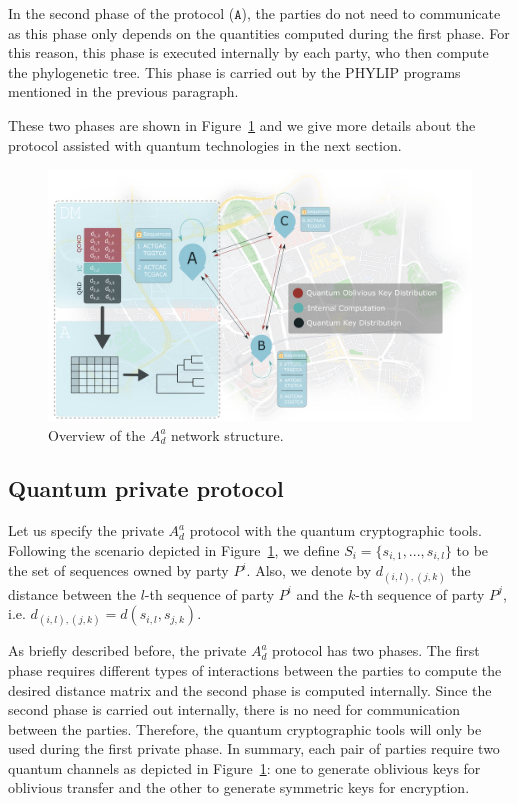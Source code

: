In the second phase of the protocol ($\mathtt{A}$), the parties do not need to communicate as this phase only depends on the quantities computed during the first phase. For this reason, this phase is executed internally by each party, who then compute the phylogenetic tree. This phase is carried out by the PHYLIP programs mentioned in the previous paragraph.

These two phases are shown in Figure~\ref{fig:network} and we give more details about the protocol assisted with quantum technologies in the next section. 

\begin{figure}[t]
    \centering
    \includegraphics[scale=0.8]{Chapter_PrivatePhylogeneticTrees/PPT.png}
    \caption{Overview of the $A^a_d$ network structure.}
    \label{fig:network}
\end{figure}

\subsection{Quantum private protocol}\label{privProtocol}

Let us specify the private $A_d^a$ protocol with the quantum cryptographic tools. Following the scenario depicted in Figure~\ref{fig:network}, we define $S_i = \{s_{i,1}, ..., s_{i,l}\}$ to be the set of sequences owned by party $P^i$. Also, we denote by $d_{(i,l), (j, k)}$ the distance between the $l$-th sequence of party $P^i$ and the $k$-th sequence of party $P^j$, i.e. $d_{(i,l), (j, k)} = d(s_{i,l}, s_{j,k})$.

As briefly described before, the private $A_d^a$ protocol has two phases. The first phase requires different types of interactions between the parties to compute the desired distance matrix and the second phase is computed internally. Since the second phase is carried out internally, there is no need for communication between the parties. Therefore, the quantum cryptographic tools will only be used during the first private phase. In summary, each pair of parties require two quantum channels as depicted in Figure~\ref{fig:network}: one to generate oblivious keys for oblivious transfer and the other to generate symmetric keys for encryption.

